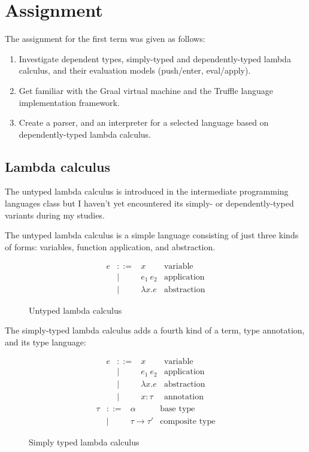 \documentclass{SPFIT}
\begin{document}
\section{Assignment}
\label{sec:org577ba43}
The assignment for the first term was given as follows:
\begin{enumerate}
\item Investigate dependent types, simply-typed and dependently-typed lambda
calculus, and their evaluation models (push/enter, eval/apply).
\item Get familiar with the Graal virtual machine and the Truffle language
implementation framework.
\item Create a parser, and an interpreter for a selected language based on
dependently-typed lambda calculus.
\end{enumerate}

\subsection{Lambda calculus}
\label{sec:org808842e}
The untyped lambda calculus is introduced in the intermediate programming
languages class but I haven't yet encountered its simply- or dependently-typed
variants during my studies.

The untyped lambda calculus is a simple language consisting of just three kinds
of forms: variables, function application, and abstraction.

\begin{figure}[!htpb]
\[\begin{array}{ccll}
e & ::= & x            & \text{variable} \\
  & |   & e_1~e_2      & \text{application} \\
  & |   & \lambda x. e & \text{abstraction}
\end{array}\]
\caption{Untyped lambda calculus}
\end{figure}

The simply-typed lambda calculus adds a fourth kind of a term, type annotation,
and its type language:

\begin{figure}[!htpb]
\[\begin{array}{ccll}
e & ::= & x           & \text{variable} \\
  & |   & e_1~e_2      & \text{application} \\
  & |   & \lambda x. e & \text{abstraction} \\
  & |   & x:\tau     & \text{annotation}
\end{array}\]
\[\begin{array}{ccll}
\tau & ::= & \alpha           & \text{base type} \\
     & |   & \tau\rightarrow\tau' & \text{composite type}
\end{array}\]
\caption{Simply typed lambda calculus}
\end{figure}
\end{document}
